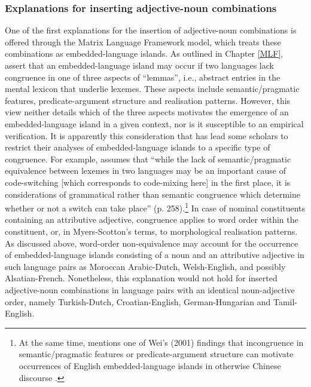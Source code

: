 \subsubsection{Explanations for inserting adjective-noun combinations}\label{explanations}
One of the first explanations for the insertion of adjective-noun combinations is offered through the Matrix Language Framework model, which treats these combinations as embedded-language islands. As outlined in Chapter \ref{MLF}, \citet{myers-scotton-matching-1995} assert that an embedded-language island may occur if two languages lack congruence in one of three aspects of ``lemmas'', i.e., abstract entries in the mental lexicon that underlie lexemes. These aspects include semantic/pragmatic features, predicate-argument structure and realisation patterns. However, this view neither details which of the three aspects motivates the emergence of an embedded-language island in a given context, nor is it susceptible to an empirical verification. It is apparently this consideration that has lead some scholars to restrict their analyses of embedded-language islands to a specific type of congruence. For example, \citet{deuchar-congruence-2005} assumes that ``while the lack of semantic/pragmatic equivalence between lexemes in two languages may be an important cause of code-switching [which corresponds to code-mixing here] in the first place, it is considerations of grammatical rather than semantic congruence which determine whether or not a switch can take place'' (p. 258).\footnote{At the same time, \citet{deuchar-congruence-2005} mentions one of Wei's (2001) findings that incongruence in semantic/pragmatic features or predicate-argument structure can motivate occurrences of English embedded-language islands in otherwise Chinese discourse \citep[quoted in][258]{deuchar-congruence-2005}.} In case of nominal constituents containing an attributive adjective, congruence applies to word order within the constituent, or, in Myers-Scotton's terms, to morphological realisation patterns. As discussed above, word-order non-equivalence may account for the occurrence of embedded-language islands consisting of a noun and an attributive adjective in such language pairs as Moroccan Arabic-Dutch, Welsh-English, and possibly Alsatian-French. Nonetheless, this explanation would not hold for inserted adjective-noun combinations in language pairs with an identical noun-adjective order, namely Turkish-Dutch, Croatian-English, German-Hungarian and Tamil-English.

